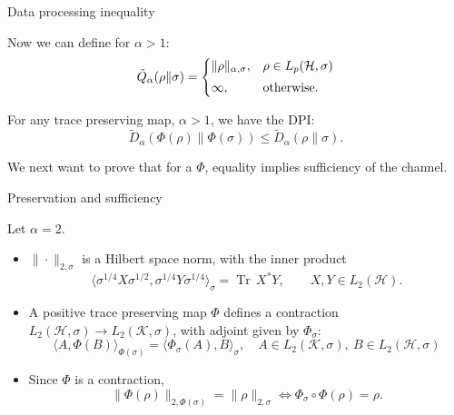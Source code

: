 \documentclass[mathserif]{beamer}
\newcommand{\<}{\langle}
\renewcommand{\>}{\rangle}
\newcommand{\Tr}{\operatorname{Tr}\,}
\newcommand{\Ha}{\mathcal H}
\newcommand{\Ka}{\mathcal K}
\begin{document}
\begin{frame}{Data processing inequality}

Now we can define for $\alpha>1$:
\[
\tilde Q_\alpha(\rho\|\sigma)=\begin{dcases} \|\rho\|_{\alpha,\sigma}, & \rho\in
L_p(\Ha,\sigma)\\[0.2em]
\infty, & \text{otherwise}.
\end{dcases}
\]

\medskip

For any  trace preserving map, $\alpha>1$, we have the DPI:
\[
\tilde D_\alpha(\Phi(\rho)\|\Phi(\sigma))\le \tilde D_\alpha(\rho\|\sigma).
\]

\medskip

We next want to prove that for a  $\Phi$, equality implies sufficiency
of the channel.


\end{frame}


\begin{frame}{Preservation and sufficiency}

Let $\alpha=2$.
\medskip

\begin{itemize}
\item $\|\cdot\|_{2,\sigma}$ is a Hilbert space norm, with the inner product
\[
\<\sigma^{1/4}X\sigma^{1/2},\sigma^{1/4}Y\sigma^{1/4}\>_\sigma= \Tr X^*Y,\qquad X,Y\in
L_2(\Ha).
\]
\item A positive trace preserving map $\Phi$ defines a contraction $L_2(\Ha,\sigma)\to
L_2(\Ka,\sigma)$, with adjoint  given by $\Phi_\sigma$:
\[
\<A,\Phi(B)\>_{\Phi(\sigma)}=\<\Phi_\sigma(A),B\>_\sigma,\quad A\in L_2(\Ka,\sigma),\
B\in  L_2(\Ha,\sigma)
\]
\item Since $\Phi$ is a contraction, 
\[
\|\Phi(\rho)\|_{2,\Phi(\sigma)}=\|\rho\|_{2,\sigma} \iff \Phi_\sigma\circ \Phi(\rho)=\rho.
\]
\end{itemize}

\end{frame}
\end{document}

